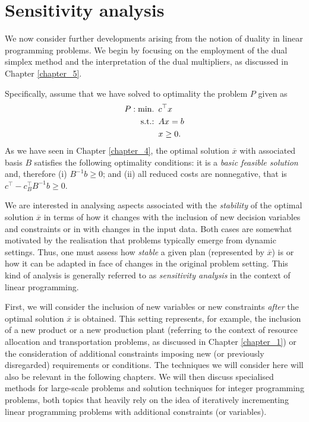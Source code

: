 \section{Sensitivity analysis}

We now consider further developments arising from the notion of duality in linear programming problems. We begin by focusing on the employment of the dual simplex method and the interpretation of the dual multipliers, as discussed in Chapter \ref{chapter_5}. 

Specifically, assume that we have solved to optimality the problem $P$ given as
%
\begin{align*}
	P : \mathop{\text{min.~}} \, &c^\top x \\
	\mathop{\text{s.t.:~}} \, & Ax = b \\
	& x \geq 0. 	
\end{align*}
%
As we have seen in Chapter \ref{chapter_4}, the optimal solution $\overline{x}$ with associated basis $B$ satisfies the following optimality conditions: it is a \emph{basic feasible solution} and, therefore (i) $B^{-1}b \geq 0$; and (ii) all reduced costs are nonnegative, that is $c^\top - c_B^\top B^{-1}b \geq 0$.

We are interested in analysing aspects associated with the \emph{stability} of the optimal solution $\overline{x}$ in terms of how it changes with the inclusion of new decision variables and constraints or in with changes in the input data. Both cases are somewhat motivated by the realisation that problems typically emerge from dynamic settings. Thus, one must assess how \emph{stable} a given plan (represented by $\overline{x}$) is or how it can be adapted in face of changes in the original problem setting. This kind of analysis is generally referred to as \emph{sensitivity analysis} in the context of linear programming.

First, we will consider the inclusion of new variables or new constraints \emph{after} the optimal solution $\overline{x}$ is obtained. This setting represents, for example, the inclusion of a new product or a new production plant (referring to the context of resource allocation and transportation problems, as discussed in Chapter \ref{chapter_1}) or the consideration of additional constraints imposing new (or previously disregarded) requirements or conditions. The techniques we will consider here will also be relevant in the following chapters. We will then discuss specialised methods for large-scale problems and solution techniques for integer programming problems, both topics that heavily rely on the idea of iteratively incrementing linear programming problems with additional constraints (or variables).

